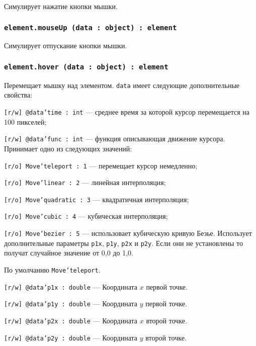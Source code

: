 Симулирует нажатие кнопки мышки.

\subsubsection{\texttt{element.mouseUp (data : object) : element}}

Симулирует отпускание кнопки мышки.

\subsubsection{\texttt{element.hover (data : object) : element}}

Перемещает мышку над элементом. \texttt{data} имеет следующие дополнительные свойства:
\begin{icItems}
	\item \texttt{[r/w] @data'time : int} — среднее время за которой курсор перемещается на 100 пикселей;
	\item \texttt{[r/w] @data'func : int} — функция описывающая движение курсора. Принимает одно из следующих значений:
	\begin{icItems}
		\item \texttt{[r/o] Move'teleport : 1} — перемещает курсор немедленно;
		\item \texttt{[r/o] Move'linear : 2} — линейная интерполяция;
		\item \texttt{[r/o] Move'quadratic : 3} — квадратичная интерполяция;
		\item \texttt{[r/o] Move'cubic : 4} — кубическая интерполяция;
		\item \texttt{[r/o] Move'bezier : 5} — использовает кубическую кривую Безье. Использует дополнительные параметры \texttt{p1x}, \texttt{p1y}, \texttt{p2x} и \texttt{p2y}. Если они не установлены то получат случайное значение от 0,0 до 1,0.
	\end{icItems}
	По умолчанию \texttt{Move'teleport}.
	\item \texttt{[r/w] @data'p1x : double} — Координата $x$ первой точке.
	\item \texttt{[r/w] @data'p1y : double} — Координата $y$ первой точке.
	\item \texttt{[r/w] @data'p2x : double} — Координата $x$ второй точке.
	\item \texttt{[r/w] @data'p2y : double} — Координата $y$ второй точке.
\end{icItems}

